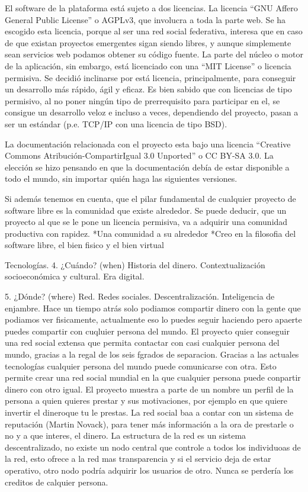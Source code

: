 El software de la plataforma  está sujeto a dos licencias. La licencia ``GNU Affero General Public License'' o AGPLv3, que involucra a toda la parte web. Se ha escogido esta licencia, porque al ser una red social federativa, interesa que en caso de que existan proyectos emergentes sigan siendo libres, y aunque simplemente sean servicios web podamos obtener su código fuente. La parte del núcleo o motor de la aplicación, sin embargo, está licenciado con una ``MIT License'' o licencia permisiva. Se decidió inclinarse por está licencia, principalmente, para conseguir un desarrollo más rápido, ágil y eficaz. Es bien sabido que con licencias de tipo permisivo, al no poner ningún tipo de prerrequisito para participar en el, se consigue un desarrollo veloz e incluso a veces, dependiendo del proyecto, pasan a ser un estándar (p.e. TCP/IP con una licencia de tipo BSD). 

La documentación relacionada con el proyecto esta bajo una licencia ``Creative Commons Atribución-CompartirIgual 3.0 Unported'' o CC BY-SA 3.0. La elección se hizo pensando en que la documentación debía de estar disponible a todo el mundo, sin importar quién haga las siguientes versiones.

Si además tenemos en cuenta, que el pilar fundamental de cualquier proyecto de software libre es la comunidad que existe alrededor. Se puede deducir, que un proyecto al que se le pone un licencia permisiva, va a adquirir una comunidad productiva con rapidez.
*Una comunidad a su alrededor
*Creo en la filosofia del software libre, el bien fisico y el bien virtual

Tecnologías.
4. ¿Cuándo? (when) 
Historia del dinero.
Contextualización socioeconómica y cultural. Era digital.

5. ¿Dónde? (where) 
Red. Redes sociales.
Descentralización. Inteligencia de enjambre.
Hace un tiempo atrás solo podiamos compartir dinero con la gente que podiamos ver fisicamente, actualmente eso lo puedes seguir haciendo pero apaerte puedes compartir con cuqluier persona del mundo. El proyecto quier conseguir una red social extensa que permita contactar con casi cualquier persona del mundo, gracias a la regal de los seis fgrados de separacion. Gracias a las actuales tecnologías cualquier persona del mundo puede comunicarse con otra. Esto permite crear una red social mundial en la que cualquier persona puede conpartir dinero con otro igual. El proyecto muestra  a parte de un nombre un perfil de la persona a quien quieres prestar y sus motivaciones, por ejemplo en que quiere invertir el dineroque tu le prestas. La red social baa a contar con un sistema de reputación (Martin Novack), para tener más información a la ora de prestarle o no  y a que interes, el dinero. La estructura de la red es un sistema descentralizado, no existe un nodo central que controle a todos los individuoas de la red, esto ofrece a la red mas transparencia y si el servicio deja de estar operativo, otro nodo podría adquirir los usuarios de otro. Nunca se perdería los creditos de calquier persona. 

